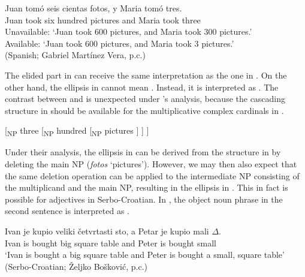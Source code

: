 \documentclass[output=paper]{langscibook}
\begin{document}
\ex\label{tat:elipc}
\gll Juan tomó seis cientas fotos, y Maria tomó tres.\\  
    Juan took six hundred pictures and Maria took three\\ 
\glt Unavailable: `Juan took 600 pictures, and Maria took 300 pictures.'\\
Available: `Juan took 600 pictures, and Maria took 3 pictures.'\\
\hfill (Spanish; Gabriel Martínez Vera, p.c.)
\z
\z

\noindent The elided part in  can receive the same interpretation as the one in . On the other hand, the ellipsis in  cannot mean . Instead, it is interpreted as . The contrast between  and  is unexpected under \citeauthor{IoninMatushansky2018}'s analysis, because the cascading structure in  should be available for the multiplicative complex cardinals in .

\ea\label{tat:ex:cas2}
{[}\textsubscript{NP} three [\textsubscript{NP} hundred [\textsubscript{NP} pictures ] ] ]\hfill\citep{IoninMatushansky2018}
\z

\noindent Under their analysis, the ellipsis in  can be derived from the structure in  by deleting the main NP (\textit{fotos} `pictures'). However, we may then also expect that the same deletion operation can be applied to the intermediate NP consisting of the multiplicand and the main NP, resulting in the ellipsis in . This in fact is possible for adjectives in Serbo-Croatian. In , the object noun phrase in the second sentence is interpreted as .  

\ea\label{tat:inter.ellipsis}
\gll Ivan je kupio veliki \v{c}etvrtasti sto, a Petar je kupio mali $\Delta$.\\
   Ivan is bought big square table and Peter is bought small {}\\
\glt `Ivan is bought a big square table and Peter is bought a small, square table' \hfill(Serbo-Croatian; Željko Bošković, p.c.)
\z
\end{document}
